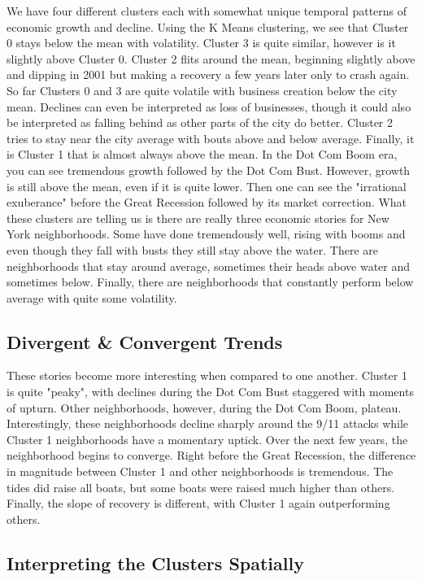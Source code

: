 \documentclass[letter, 11pt]{article} %
\begin{document}
		We have four different clusters each with somewhat unique temporal patterns of economic growth and decline. Using the K Means clustering, we see that Cluster 0 stays below the mean with volatility. Cluster 3 is quite similar, however is it slightly above Cluster 0. Cluster 2 flits around the mean, beginning slightly above and dipping in 2001 but making a recovery a few years later only to crash again. So far Clusters 0 and 3 are quite volatile with business creation below the city mean. Declines can even be interpreted as loss of businesses, though it could also be interpreted as falling behind as other parts of the city do better. Cluster 2 tries to stay near the city average with bouts above and below average. Finally, it is Cluster 1 that is almost always above the mean. In the Dot Com Boom era, you can see tremendous growth followed by the Dot Com Bust. However, growth is still above the mean, even if it is quite lower. Then one can see the "irrational exuberance" before the Great Recession followed by its market correction. What these clusters are telling us is there are really three economic stories for New York neighborhoods. Some have done tremendously well, rising with booms and even though they fall with busts they still stay above the water. There are neighborhoods that stay around average, sometimes their heads above water and sometimes below. Finally, there are neighborhoods that constantly perform below average with quite some volatility. 
		
	\subsection{Divergent \& Convergent Trends}
	
		These stories become more interesting when compared to one another. Cluster 1 is quite "peaky", with declines during the Dot Com Bust staggered with moments of upturn. Other neighborhoods, however, during the Dot Com Boom, plateau. Interestingly, these neighborhoods decline sharply around the 9/11 attacks while Cluster 1 neighborhoods have a momentary uptick. Over the next few years, the neighborhood begins to converge. Right before the Great Recession, the difference in magnitude between Cluster 1 and other neighborhoods is tremendous. The tides did raise all boats, but some boats were raised much higher than others. Finally, the slope of recovery is different, with Cluster 1 again outperforming others. 
	
	\subsection{Interpreting the Clusters Spatially}
	
\end{document}
